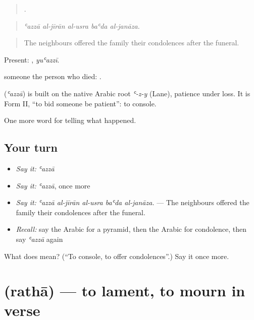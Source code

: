 \begin{quote}
    .
\end{quote}

\begin{quote}
\emph{ʿazzā al-jīrān al-usra baʿda al-janāza.}
\end{quote}

\begin{quote}
The neighbours offered the family their condolences after the funeral.
\end{quote}

Present: , \emph{yuʿazzī}.

 someone  the person who died:   .

\begin{cousinweb}
\textbf{} (\emph{ʿazzā}) is built on the native Arabic root \emph{ʿ-z-y} (Lane), patience under loss. It is Form II, \textquotedblleft{}to bid someone be patient\textquotedblright{}: to console.
\end{cousinweb}

\begin{grammarlens}[title={What you've built}]
One more word for telling what happened.
\end{grammarlens}

\subsection*{Your turn}
\begin{itemize}
\raggedright
  \item \emph{Say it:} \emph{ʿazzā}
  \item \emph{Say it:} \emph{ʿazzā}, once more
  \item \emph{Say it:} \emph{ʿazzā al-jīrān al-usra baʿda al-janāza.} — The neighbours offered the family their condolences after the funeral.
  \item \emph{Recall:} say the Arabic for a pyramid, then the Arabic for condolence, then say \emph{ʿazzā} again
\end{itemize}

\begin{tcolorbox}[breakable,colback=teal!4,colframe=teal!35!black,title={Before you move on}]
What does  mean? (\textquotedblleft{}To console, to offer condolences\textquotedblright{}.) Say it once more.
\end{tcolorbox}
\section[\texorpdfstring{\ar{رثى} (rathā)}{رثى (rathā)}]{ (rathā) — to lament, to mourn in verse}

